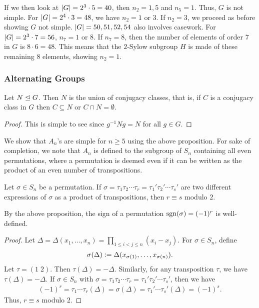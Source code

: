 If we then look at $\left| G \right| = 2^{3} \cdot 5 = 40$, then $n_{2} = 1,5$ and $n_{5} = 1$. Thus, $G$ is not simple. For $\left| G \right| = 2^{4} \cdot 3 = 48$, we have $n_{2} = 1$ or $3$. If $n_{2} = 3$, we proceed as before showing $G$ not simple. $\left| G \right| = 50,51,52,54$ also involves casework. For $\left| G \right| = 2^{3} \cdot 7 = 56$, $n_{7} = 1$ or $8$. If $n_{7} = 8$, then the number of elements of order $7$ in $G$ is $8 \cdot 6 = 48$. This means that the $2$-Sylow subgroup $H$ is made of these remaining $8$ elements, showing $n_{2} = 1$.

\subsubsection{Alternating Groups}

\begin{proposition}
    Let $N \trianglelefteq G$. Then $N$ is the union of conjugacy classes, that is, if $C$ is a conjugacy class in $G$ then $C \subseteq N$ or $C \cap N = \emptyset$.
\end{proposition}
\begin{proof}
    This is simple to see since $g^{-1}Ng = N$ for all $g \in G$.
\end{proof}

We show that $A_{n}$'s are simple for $n \geq 5$ using the above proposition. For sake of completion, we note that $A_{n}$ is defined to the subgroup of $S_{n}$ containing all even permutations, where a permutation is deemed even if it can be written as the product of an even number of transpositions.

\begin{proposition}
    Let $\sigma \in S_{n}$ be a permutation. If $\sigma = \tau_{1}\tau_{2}\cdots\tau_{r} = \tau_{1}'\tau_{2}'\cdots\tau_{s}'$ are two different expressions of $\sigma$ as a product of transpositions, then $r \equiv s$ modulo $2$.
\end{proposition}
By the above proposition, the sign of a permutation $\operatorname{sgn}(\sigma) = (-1)^{r}$ is well-defined.
\begin{proof}
    Let $\Delta = \Delta(x_{1},\ldots,x_{n}) = \prod_{1 \leq i < j \leq n} (x_{i}-x_{j})$. For $\sigma \in S_{n}$, define
    \begin{align}
        \sigma(\Delta) \vcentcolon= \Delta(x_{\sigma(1)},\ldots,x_{\sigma(n)}).
    \end{align}
    Let $\tau = (1\;2)$. Then $\tau(\Delta) = -\Delta$. Similarly, for any transposition $\tau$, we have $\tau(\Delta) = -\Delta$. If $\sigma \in S_{n}$ with $\sigma = \tau_{1}\tau_{2}\cdots\tau_{r} = \tau_{1}'\tau_{2}'\cdots\tau_{s}'$, then we have
    \begin{align}
        (-1)^{r} = \tau_{1}\cdots\tau_{r}(\Delta) = \sigma(\Delta) = \tau_{1}'\cdots\tau_{s}'(\Delta) = (-1)^{s}.
    \end{align}
    Thus, $r \equiv s$ modulo $2$.
\end{proof}

